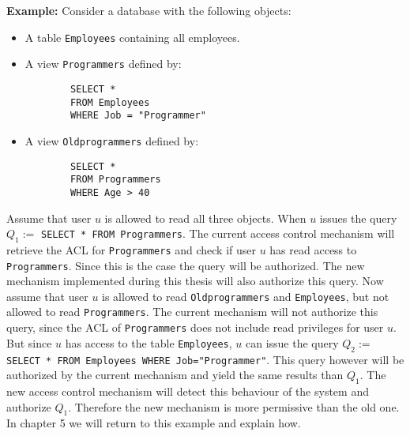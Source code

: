 \smallskip
\noindent
{\bf Example:}
%
Consider a database with the following objects:
%
\begin{itemize}
	\item A table \texttt{Employees} containing all employees.
	\item A view \texttt{Programmers} defined by:
		\begin{verbatim}
		SELECT * 
		FROM Employees
		WHERE Job = "Programmer"
		\end{verbatim}
	\item A view \texttt{Oldprogrammers} defined by:
		\begin{verbatim}
		SELECT *
		FROM Programmers
		WHERE Age > 40
		\end{verbatim}
\end{itemize}
%
Assume that user $u$ is allowed to read all three objects. When $u$ issues the query $Q_1 := $ \texttt{SELECT * FROM Programmers}. 
%
The current access control mechanism will retrieve the ACL for \texttt{Programmers} and check if user $u$ has read access to \texttt{Programmers}. 
%
Since this is the case the query will be authorized.
%
The new mechanism implemented during this thesis will also authorize this query.
%
Now assume that user $u$ is allowed to read \texttt{Oldprogrammers} and \texttt{Employees}, but not allowed to read \texttt{Programmers}.
%
The current mechanism will not authorize this query, since the ACL of \texttt{Programmers} does not include read privileges for user $u$.
%
But since $u$ has access to the table \texttt{Employees}, $u$ can issue the query $Q_2 := $ \texttt{SELECT * FROM Employees WHERE Job="Programmer"}.
%
This query however will be authorized by the current mechanism and yield the same results than $Q_1$.
%
The new access control mechanism will detect this behaviour of the system and authorize $Q_1$.
%
Therefore the new mechanism is more permissive than the old one.
%
In chapter 5 we will return to this example and explain how.
